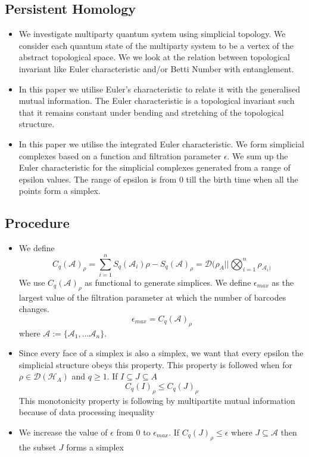\subsection{Persistent Homology}
\begin{itemize}
    \item We investigate multiparty quantum system using simplicial topology. We consider each quantum state of the multiparty system to be a vertex of the abstract topological space. We we look at the relation between topological invariant like Euler characteristic and/or Betti Number with entanglement.
    \item In this paper we utilise Euler's characteristic to relate it with the generalised mutual information. The Euler characteristic is a topological invariant such that it remains constant under bending and stretching of the topological structure. 
    \item In this paper we utilise the integrated Euler characteristic. We form simplicial complexes based on a function and filtration parameter $\epsilon$. We sum up the Euler characteristic for the simplicial complexes generated from a range of epsilon values. The range of epsilon is from $0$ till the birth time when all the points form a simplex.
    
\end{itemize}
\subsection{Procedure}
\begin{itemize}
    \item We define 
    \begin{equation}
    C_q(\mathcal{A})_\rho = \sum^n_{i=1} S_q(\mathcal{A}_i)\rho - S_q(\mathcal{A})_\rho = \mathcal{D}(\rho_A \vert \vert \bigotimes^n_{i=1}\rho_{\mathcal{A}_i)}
\end{equation}
We use $C_q(\mathcal{A})_\rho$ as functional to generate simplices. We define $\epsilon_{max}$ as the largest value of the filtration parameter at which the number of barcodes changes. 
 $$\epsilon_{max} = C_q(\mathcal{A})_\rho$$ where  $\mathcal{A} := \{ \mathcal{A}_1,...\mathcal{A}_n \}$.
 \item Since every face of a simplex is also a simplex, we want that every epsilon the simplicial structure obeys this property. This property is followed when for $\rho \in \mathcal{D}(\mathcal{H}_A)$ and $q \geq 1$. If $I \subseteq J \subseteq A$
 \begin{equation}
     C_q(I)_\rho \leq C_q(J)_\rho
 \end{equation}
 This monotonicity property is following by multipartite mutual information because of data processing inequality
 \item We increase the value of $\epsilon$ from 0 to $\epsilon_{max}$. If $C_q(J)_\rho \leq \epsilon$ where $J \subseteq \mathcal{A}$ then the subset $J$ forms a simplex
\end{itemize}
